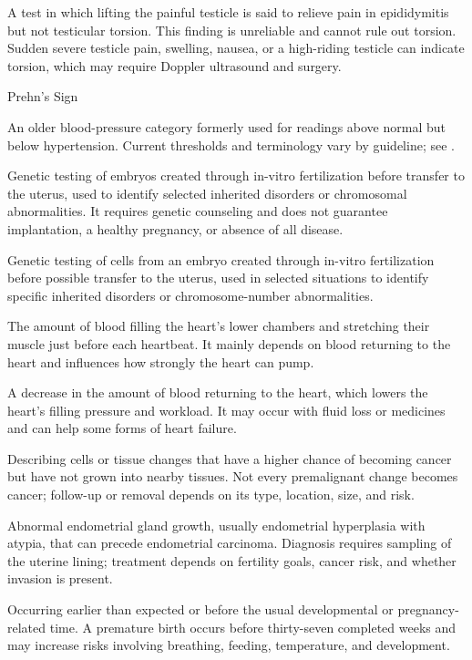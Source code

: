  A test in which lifting the painful testicle is said to relieve pain in epididymitis but not testicular torsion. This finding is unreliable and cannot rule out torsion. Sudden severe testicle pain, swelling, nausea, or a high-riding testicle can indicate torsion, which may require Doppler ultrasound and surgery.

\synonyms
Prehn's Sign

 An older blood-pressure category formerly used for readings above normal but below hypertension. Current thresholds and terminology vary by guideline; see .

 Genetic testing of embryos created through in-vitro fertilization before transfer to the uterus, used to identify selected inherited disorders or chromosomal abnormalities. It requires genetic counseling and does not guarantee implantation, a healthy pregnancy, or absence of all disease.

 Genetic testing of cells from an embryo created through in-vitro fertilization before possible transfer to the uterus, used in selected situations to identify specific inherited disorders or chromosome-number abnormalities.

 The amount of blood filling the heart’s lower chambers and stretching their muscle just before each heartbeat. It mainly depends on blood returning to the heart and influences how strongly the heart can pump.

 A decrease in the amount of blood returning to the heart, which lowers the heart’s filling pressure and workload. It may occur with fluid loss or medicines and can help some forms of heart failure.

 Describing cells or tissue changes that have a higher chance of becoming cancer but have not grown into nearby tissues. Not every premalignant change becomes cancer; follow-up or removal depends on its type, location, size, and risk.

 Abnormal endometrial gland growth, usually endometrial hyperplasia with atypia, that can precede endometrial carcinoma. Diagnosis requires sampling of the uterine lining; treatment depends on fertility goals, cancer risk, and whether invasion is present.

 Occurring earlier than expected or before the usual developmental or pregnancy-related time. A premature birth occurs before thirty-seven completed weeks and may increase risks involving breathing, feeding, temperature, and development.

